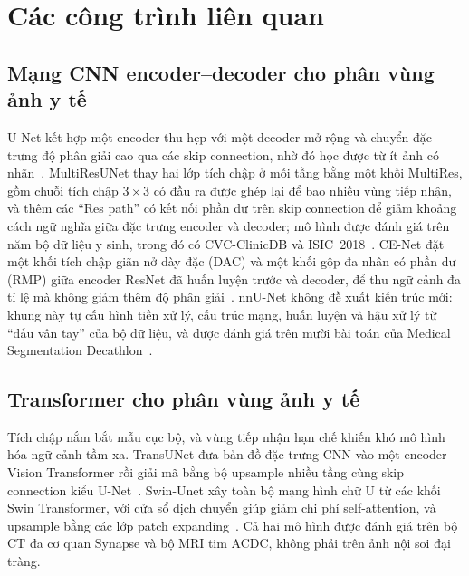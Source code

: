 \documentclass[10pt,twoside]{article}
\begin{document}
\section{Các công trình liên quan}\label{sec:related}
\subsection{Mạng CNN encoder--decoder cho phân vùng ảnh y tế}
U-Net kết hợp một encoder thu hẹp với một decoder mở rộng và chuyển đặc trưng độ
phân giải cao qua các skip connection, nhờ đó học được từ ít ảnh có
nhãn~\cite{ronneberger2015unet}. MultiResUNet thay hai lớp tích chập ở mỗi tầng bằng
một khối MultiRes, gồm chuỗi tích chập $3\times3$ có đầu ra được ghép lại để bao
nhiều vùng tiếp nhận, và thêm các ``Res path'' có kết nối phần dư trên skip connection
để giảm khoảng cách ngữ nghĩa giữa đặc trưng encoder và decoder; mô hình được đánh
giá trên năm bộ dữ liệu y sinh, trong đó có CVC-ClinicDB và
ISIC~2018~\cite{ibtehaz2020multiresunet}. CE-Net đặt một khối tích chập giãn nở dày
đặc (DAC) và một khối gộp đa nhân có phần dư (RMP) giữa encoder ResNet đã huấn luyện
trước và decoder, để thu ngữ cảnh đa tỉ lệ mà không giảm thêm độ phân
giải~\cite{gu2019cenet}. nnU-Net không đề xuất kiến trúc mới: khung này tự cấu hình
tiền xử lý, cấu trúc mạng, huấn luyện và hậu xử lý từ ``dấu vân tay'' của bộ dữ liệu,
và được đánh giá trên mười bài toán của Medical Segmentation
Decathlon~\cite{isensee2018nnunet}.

\subsection{Transformer cho phân vùng ảnh y tế}
Tích chập nắm bắt mẫu cục bộ, và vùng tiếp nhận hạn chế khiến khó mô hình hóa ngữ
cảnh tầm xa. TransUNet đưa bản đồ đặc trưng CNN vào một encoder Vision Transformer
rồi giải mã bằng bộ upsample nhiều tầng cùng skip connection kiểu
U-Net~\cite{chen2021transunet}. Swin-Unet xây toàn bộ mạng hình chữ U từ các khối
Swin Transformer, với cửa sổ dịch chuyển giúp giảm chi phí self-attention, và
upsample bằng các lớp patch expanding~\cite{cao2022swinunet}. Cả hai mô hình được
đánh giá trên bộ CT đa cơ quan Synapse và bộ MRI tim ACDC, không phải trên ảnh nội
soi đại tràng.
\end{document}
